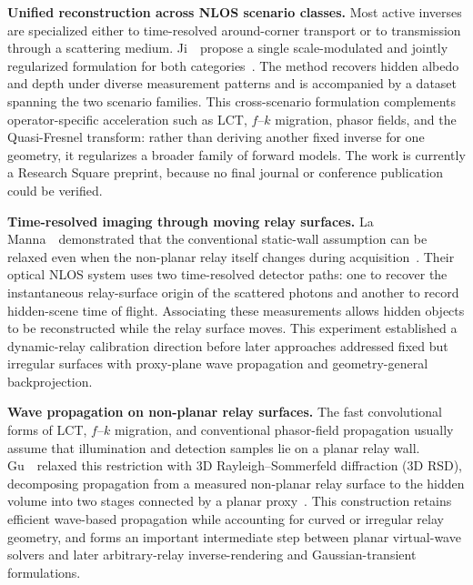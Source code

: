 \vspace{0.8mm}
\noindent \textbf{Unified reconstruction across NLOS scenario classes.}
Most active inverses are specialized either to time-resolved around-corner transport or to transmission through a scattering medium. Ji~\etal~propose a single scale-modulated and jointly regularized formulation for both categories~\cite{jiUnifiedRealTimeNLOS2026}. The method recovers hidden albedo and depth under diverse measurement patterns and is accompanied by a dataset spanning the two scenario families. This cross-scenario formulation complements operator-specific acceleration such as LCT, $f$--$k$ migration, phasor fields, and the Quasi-Fresnel transform: rather than deriving another fixed inverse for one geometry, it regularizes a broader family of forward models. The work is currently a Research Square preprint, because no final journal or conference publication could be verified.

\vspace{0.8mm}
\noindent \textbf{Time-resolved imaging through moving relay surfaces.}
La Manna~\etal~demonstrated that the conventional static-wall assumption can be relaxed even when the non-planar relay itself changes during acquisition~\cite{mannaNonlineofsightimagingUsingDynamic2020}. Their optical NLOS system uses two time-resolved detector paths: one to recover the instantaneous relay-surface origin of the scattered photons and another to record hidden-scene time of flight. Associating these measurements allows hidden objects to be reconstructed while the relay surface moves. This experiment established a dynamic-relay calibration direction before later approaches addressed fixed but irregular surfaces with proxy-plane wave propagation and geometry-general backprojection.

\vspace{0.8mm}
\noindent \textbf{Wave propagation on non-planar relay surfaces.}
The fast convolutional forms of LCT, $f$--$k$ migration, and conventional phasor-field propagation usually assume that illumination and detection samples lie on a planar relay wall. Gu~\etal~relaxed this restriction with 3D Rayleigh--Sommerfeld diffraction (3D RSD), decomposing propagation from a measured non-planar relay surface to the hidden volume into two stages connected by a planar proxy~\cite{guFastNLOSNonPlanar2023}. This construction retains efficient wave-based propagation while accounting for curved or irregular relay geometry, and forms an important intermediate step between planar virtual-wave solvers and later arbitrary-relay inverse-rendering and Gaussian-transient formulations.


